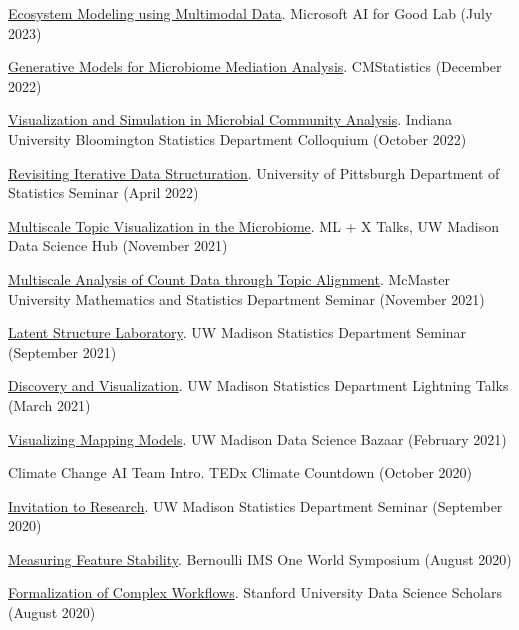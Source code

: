 \documentclass[letterpaper]{article}
\renewenvironment{itemize}{
  \begin{list}{}{
    \setlength{\leftmargin}{1.5em}
  }
}{
  \end{list}
}
\begin{document}
\begin{itemize}
  \item \href{https://krisrs1128.github.io/talks/2023/20230705/20230705.html}{Ecosystem Modeling using Multimodal Data}. Microsoft AI for Good Lab (July 2023)
  \item \href{https://krisrs1128.github.io/talks/2022/20221217/20221217.html}{Generative Models for Microbiome Mediation Analysis}. CMStatistics (December 2022)
  \item \href{https://krisrs1128.github.io/talks/2022/20221021/20221021.html}{Visualization and Simulation in Microbial Community Analysis}. Indiana University Bloomington Statistics Department Colloquium (October 2022)
  \item \href{https://drive.google.com/file/d/1ju9f8e8aRb5OYLE28Ub0Pc6i2KCpcjgN/view?usp=sharing}{Revisiting Iterative Data Structuration}. University of Pittsburgh Department of Statistics Seminar (April 2022)
  \item \href{https://drive.google.com/file/d/14Lwhvd28sGEMSpw3AXZUsg8XXL25Gr4J/view?usp=sharing}{Multiscale Topic Visualization in the Microbiome}. ML + X Talks, UW Madison Data Science Hub (November 2021)
  \item \href{https://drive.google.com/file/d/1vcs_aLp6gZFixenGscrj6C5koEltxvGa/view?usp=sharing}{Multiscale Analysis of Count Data through Topic Alignment}. McMaster University Mathematics and Statistics Department Seminar (November 2021)
  \item \href{https://drive.google.com/file/d/1xwYyGc1bx7W-F5QyQlB3OJZT7MVTpdYd/view?usp=sharing}{Latent Structure Laboratory}. UW Madison Statistics Department Seminar (September 2021)
  \item \href{https://drive.google.com/drive/folders/16P8ZeKM1IEZFgCHgSxakUymamMZkNkTl}{Discovery and Visualization}. UW Madison Statistics Department Lightning Talks (March 2021)
  \item \href{https://krisrs1128.github.io/mapping-vis/}{Visualizing Mapping Models}. UW Madison Data Science Bazaar (February 2021)
  \item Climate Change AI Team Intro. TEDx Climate Countdown (October 2020)
  \item \href{https://drive.google.com/file/d/1xwYyGc1bx7W-F5QyQlB3OJZT7MVTpdYd/view?usp=sharing}{Invitation to Research}. UW Madison Statistics Department Seminar (September 2020)
  \item \href{https://www.youtube.com/watch?v=0W84gxCm83A}{Measuring Feature Stability}. Bernoulli IMS One World Symposium (August 2020)
  \item \href{https://drive.google.com/file/d/1mSRbA96aTuiIHSUmgfZKV788seF3X7p_/view?usp=sharing}{Formalization of Complex Workflows}. Stanford University Data Science Scholars (August 2020)

\end{itemize}
\end{document}
